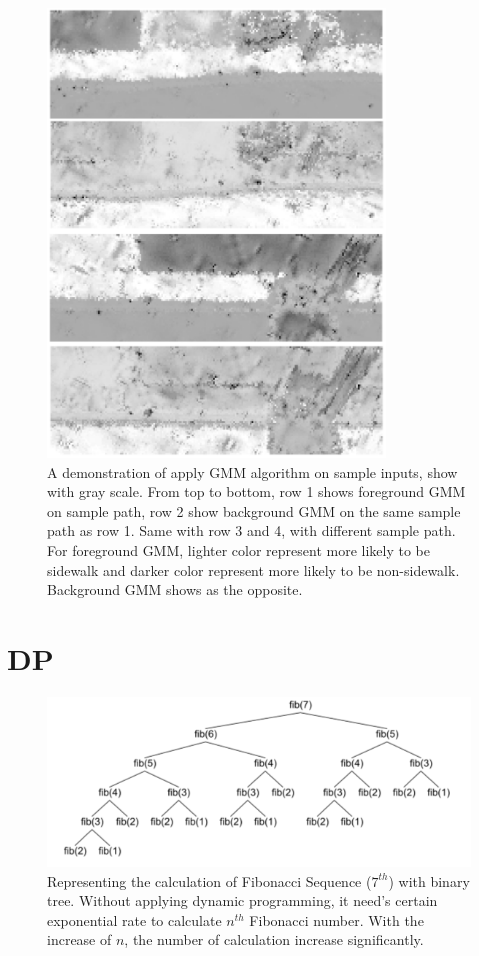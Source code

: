 \begin{figure}[H]
    \centering
    \includegraphics[width=0.8\textwidth]{Figures/gmm_sample_1.png}
    \caption[\ac{GMM} Background Subtraction]{A demonstration of apply \ac{GMM} algorithm on sample inputs, show with gray scale. From top to bottom, row 1 shows foreground \ac{GMM} on sample path, row 2 show background \ac{GMM} on the same sample path as row 1. Same with row 3 and 4, with different sample path. For foreground \ac{GMM}, lighter color represent more likely to be sidewalk and darker color represent more likely to be non-sidewalk. Background \ac{GMM} shows as the opposite.}
    \label{fig:gmm_sample_1}
\end{figure}


\section{\ac{DP}}

\begin{figure}[H]
    \centering
    \includegraphics[width=\textwidth]{Figures/QVSdv.png}
    \caption[Demonstration on Fibonacci Sequence]{Representing the calculation of Fibonacci Sequence ($7^{th}$) with binary tree. Without applying dynamic programming, it need's certain exponential rate to calculate $n^{th}$ Fibonacci number. With the increase of $n$, the number of calculation increase significantly.}
    \label{fig:fbs}
\end{figure}

